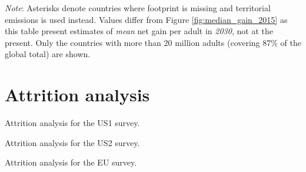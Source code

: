 \clearpage
{}
    {\footnotesize \textit{Note}: %
    Asterisks denote countries where footprint is missing and territorial emissions is used instead. %
    Values differ from Figure \ref{fig:median_gain_2015} as this table present estimates of \textit{mean} net gain per adult in \textit{2030}, not at the present. Only the countries with more than 20 million adults (covering 87\% of the global total) are shown. 
    }




\clearpage
\section{Attrition analysis}\label{app:attrition}

\begin{table}[h]\label{tab:attrition_US1}
    \caption{Attrition analysis for the US1 survey.} 
    \makebox[\textwidth][c]{
\resizebox*{!}{.73\textheight}{ %
        
        }
    }
    {\footnotesize %
    }
\end{table}

\begin{table}[h]\label{tab:attrition_US2}
    \caption{Attrition analysis for the US2 survey.} 
    \makebox[\textwidth][c]{
\resizebox*{!}{.73\textheight}{ %
        
        }
    }
    {\footnotesize %
    }
\end{table}

\begin{table}[h]\label{tab:attrition_EU}
    \caption{Attrition analysis for the EU survey.} 
    \makebox[\textwidth][c]{
\resizebox*{!}{.73\textheight}{ %
        
        }
    }
    {\footnotesize %
    }
\end{table}